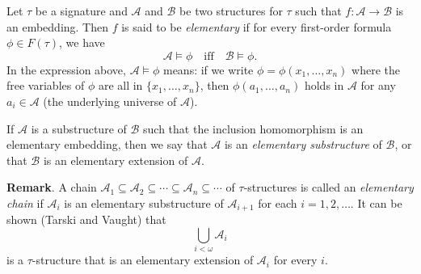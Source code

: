 \documentclass[12pt]{article}
\begin{document}
Let $\tau$ be a signature and $\mathcal{A}$ and $\mathcal{B}$ be two structures for $\tau$ such that $f:\mathcal{A}\to \mathcal{B}$ is an embedding.  Then $f$ is said to be \emph{elementary} if for every first-order formula $\phi \in F(\tau)$, we have $$\mathcal{A}\vDash\phi \quad \mbox{iff} \quad \mathcal{B}\vDash \phi.$$
In the expression above, $\mathcal{A}\vDash\phi$ means: if we write $\phi=\phi(x_1,\ldots,x_n)$ where the free variables of $\phi$ are all in $\lbrace x_1,\ldots,x_n\rbrace$, then $\phi(a_1,\ldots,a_n)$ holds in $\mathcal{A}$ for any $a_i\in \mathcal{A}$ (the underlying universe of $\mathcal{A}$).

If $\mathcal{A}$ is a substructure of $\mathcal{B}$ such that the inclusion homomorphism is an elementary embedding, then we say that $\mathcal{A}$ is an \emph{elementary substructure} of $\mathcal{B}$, or that $\mathcal{B}$ is an elementary extension of $\mathcal{A}$.

\textbf{Remark}.  A chain $\mathcal{A}_1\subseteq \mathcal{A}_2\subseteq \cdots \subseteq \mathcal{A}_n \subseteq \cdots$ of $\tau$-structures is called an \emph{elementary chain} if $\mathcal{A}_i$ is an elementary substructure of $\mathcal{A}_{i+1}$ for each $i=1,2,\ldots$.  It can be shown (Tarski and Vaught) that $$\bigcup_{i<\omega} \mathcal{A}_i$$ is a $\tau$-structure that is an elementary extension of $\mathcal{A}_i$ for every $i$.




\end{document}
